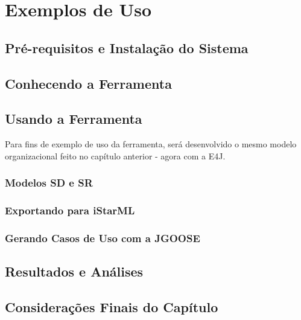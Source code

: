 \chapter{Exemplos de Uso}
    \label{cap:estudo-de-caso}

    \section{Pré-requisitos e Instalação do Sistema}

    \section{Conhecendo a Ferramenta}

    \section{Usando a Ferramenta}
        Para fins de exemplo de uso da ferramenta,
            será desenvolvido o mesmo modelo organizacional feito no capítulo anterior - agora com a E4J.

        \subsection{Modelos SD e SR}

        \subsection{Exportando para iStarML}

        \subsection{Gerando Casos de Uso com a JGOOSE}

    \section{Resultados e Análises}

    \section{Considerações Finais do Capítulo}
